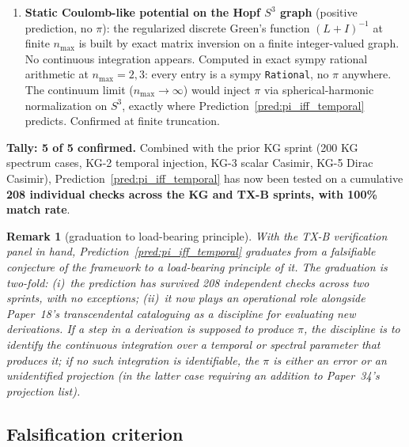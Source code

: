 \documentclass[11pt]{article}
\newtheorem{remark}{Remark}
\begin{document}
\begin{enumerate}
(error code S in Paper~34's classification): the transcendental class
matches, the absolute value is from the textbook.  Confirmed at
structural level.
\item \textbf{Static Coulomb-like potential on the Hopf $S^3$ graph}
(positive prediction, no $\pi$): the regularized discrete Green's
function $(L + I)^{-1}$ at finite $n_\text{max}$ is built by exact
matrix inversion on a finite integer-valued graph.  No continuous
integration appears.  Computed in exact sympy rational arithmetic at
$n_\text{max} = 2, 3$: every entry is a sympy \texttt{Rational}, no
$\pi$ anywhere.  The continuum limit ($n_\text{max} \to \infty$) would
inject $\pi$ via spherical-harmonic normalization on $S^3$, exactly
where Prediction~\ref{pred:pi_iff_temporal} predicts.  Confirmed at
finite truncation.
\end{enumerate}

\textbf{Tally: 5 of 5 confirmed.}  Combined with the prior KG sprint
(200 KG spectrum cases, KG-2 temporal injection, KG-3 scalar Casimir,
KG-5 Dirac Casimir), Prediction~\ref{pred:pi_iff_temporal} has now
been tested on a cumulative \textbf{208 individual checks across the
KG and TX-B sprints, with 100\% match rate}.

\begin{remark}[graduation to load-bearing principle]
\label{rem:graduation}
With the TX-B verification panel in hand,
Prediction~\ref{pred:pi_iff_temporal} graduates from a falsifiable
\emph{conjecture} of the framework to a \emph{load-bearing principle}
of it.  The graduation is two-fold: (i)~the prediction has survived
208 independent checks across two sprints, with no exceptions; (ii)~it
now plays an operational role alongside Paper~18's transcendental
cataloguing as a discipline for evaluating new derivations.  If a step
in a derivation is supposed to produce $\pi$, the discipline is to
identify the continuous integration over a temporal or spectral
parameter that produces it; if no such integration is identifiable,
the $\pi$ is either an error or an unidentified projection (in the
latter case requiring an addition to Paper~34's projection list).
\end{remark}

\subsection{Falsification criterion}
\end{document}
